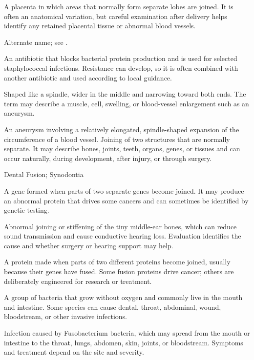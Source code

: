  A placenta in which areas that normally form separate lobes are joined. It is often an anatomical variation, but careful examination after delivery helps identify any retained placental tissue or abnormal blood vessels.

 Alternate name; see .

 An antibiotic that blocks bacterial protein production and is used for selected staphylococcal infections. Resistance can develop, so it is often combined with another antibiotic and used according to local guidance.

 Shaped like a spindle, wider in the middle and narrowing toward both ends. The term may describe a muscle, cell, swelling, or blood-vessel enlargement such as an aneurysm.

 An aneurysm involving a relatively elongated, spindle-shaped expansion of the circumference of a blood vessel.
 Joining of two structures that are normally separate. It may describe bones, joints, teeth, organs, genes, or tissues and can occur naturally, during development, after injury, or through surgery.

\synonyms
Dental Fusion; Synodontia

 A gene formed when parts of two separate genes become joined. It may produce an abnormal protein that drives some cancers and can sometimes be identified by genetic testing.

 Abnormal joining or stiffening of the tiny middle-ear bones, which can reduce sound transmission and cause conductive hearing loss. Evaluation identifies the cause and whether surgery or hearing support may help.

 A protein made when parts of two different proteins become joined, usually because their genes have fused. Some fusion proteins drive cancer; others are deliberately engineered for research or treatment.

 A group of bacteria that grow without oxygen and commonly live in the mouth and intestine. Some species can cause dental, throat, abdominal, wound, bloodstream, or other invasive infections.

 Infection caused by Fusobacterium bacteria, which may spread from the mouth or intestine to the throat, lungs, abdomen, skin, joints, or bloodstream. Symptoms and treatment depend on the site and severity.

